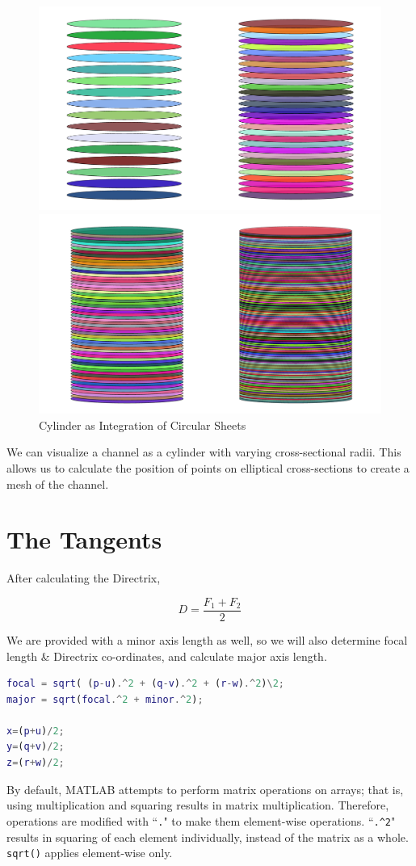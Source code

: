 \documentclass[a4paper]{article}
\begin{document}
\begin{figure}[h]
    \centering
    \includegraphics[width=0.7\linewidth]{Images/Cylinder_Stack_Left.png}
   
    \includegraphics[width=0.72\linewidth]{Images/Cylinder_Stack_Right.png}
    \caption{Cylinder as Integration of Circular Sheets}
\end{figure}

We can visualize a channel as a cylinder with varying cross-sectional radii. This allows us to calculate the position of points on elliptical cross-sections to create a mesh of the channel.
\newpage
\hypertarget{the-tangents}{%
\section{The Tangents}\label{the-tangents}}

After calculating the Directrix,

\[D = \frac{F_{1} + F_{2}}{2}\]

We are provided with a minor axis length as well, so we will also
determine focal length \& Directrix co-ordinates, and calculate major
axis length.

\begin{lstlisting}[language=matlab]
focal = sqrt( (p-u).^2 + (q-v).^2 + (r-w).^2)\2;
major = sqrt(focal.^2 + minor.^2);

x=(p+u)/2;
y=(q+v)/2;
z=(r+w)/2;
\end{lstlisting}
By default, MATLAB attempts to perform matrix operations on arrays; that is, using multiplication and squaring results in matrix multiplication. Therefore, operations are modified with ``\verb|.|" to make them element-wise operations. ``\verb|.^2|" results in squaring of each element individually, instead of the matrix as a whole. \verb|sqrt()| applies element-wise only.
\end{document}

